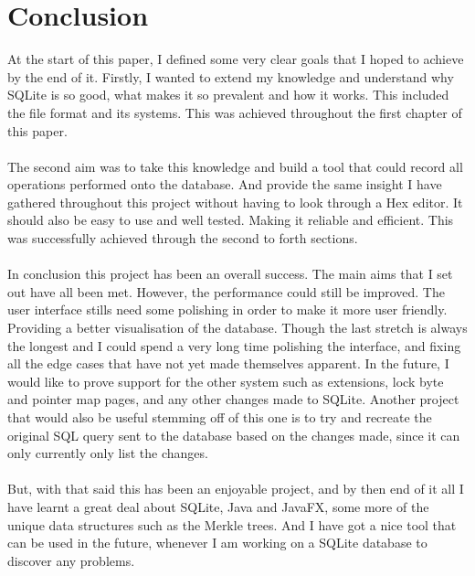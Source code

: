 \section{Conclusion}
\label{sec:conclusion}

At the start of this paper, I defined some very clear goals that I hoped to achieve by the end of it. Firstly, I wanted to extend my knowledge and understand why SQLite is so good, what makes it so prevalent and how it works. This included the file format and its systems. This was achieved throughout the first chapter of this paper. 
\\\\
The second aim was to take this knowledge and build a tool that could record all operations performed onto the database. And provide the same insight I have gathered throughout this project without having to look through a Hex editor. It should also be easy to use and well tested. Making it reliable and efficient. This was successfully achieved through the second to forth sections.
\\\\
In conclusion this project has been an overall success. The main aims that I set out have all been met. However, the performance could still be improved. The user interface stills need some polishing in order to make it more user friendly. Providing a better visualisation of the database. Though the last stretch is always the longest and I could spend a very long time polishing the  interface, and fixing all the edge cases that have not yet made themselves apparent. In the future, I would like to prove support for the other system such as  extensions, lock byte and pointer map pages, and any other changes made to SQLite. Another project that would also be useful stemming off of this one is to try and recreate the original SQL query sent to the database based on the changes made, since it can only currently only list the changes. 
\\\\
But, with that said this has been an enjoyable project, and by then end of it all I have learnt a great deal about SQLite, Java and JavaFX, some more of the unique data structures such as the Merkle trees. And I have got a nice tool that can be used in the future, whenever I am working on a SQLite database to discover any problems.